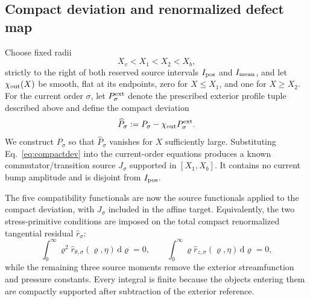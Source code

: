 \documentclass[aps,prd,reprint,superscriptaddress,nofootinbib,floatfix]{revtex4-2}
\theoremstyle{definition}
\theoremstyle{remark}
\newcommand{\dd}{\mathrm{d}}
\begin{document}
\subsection{Compact deviation and renormalized defect map}
Choose fixed radii
\begin{equation}
	X_v<X_1<X_2<X_b,
	\label{eq:spliceinterval}
\end{equation}
strictly to the right of both reserved source intervals $I_{\rm pos}$ and $I_{\rm mean}$, and let $\chi_{\rm out}(X)$ be smooth, flat at its endpoints, zero for $X\le X_1$, and one for $X\ge X_2$.  For the current order $\sigma$, let $P_\sigma^{\rm ext}$ denote the prescribed exterior profile tuple described above and define the compact deviation
\begin{equation}
	\widehat P_\sigma:=P_\sigma-\chi_{\rm out}P_\sigma^{\rm ext}.
	\label{eq:compactdev}
\end{equation}
We construct $P_\sigma$ so that $\widehat P_\sigma$ vanishes for $X$ sufficiently large.  Substituting Eq.~\eqref{eq:compactdev} into the current-order equations produces a known commutator/transition source $J_\sigma$ supported in $[X_1,X_b]$.  It contains no current bump amplitude and is disjoint from $I_{\rm pos}$.

The five compatibility functionals are now the source functionals applied to the compact deviation, with $J_\sigma$ included in the affine target.  Equivalently, the two stress-primitive conditions are imposed on the total compact renormalized tangential residual $\widehat r_\sigma$:
\begin{equation}
	\int_0^\infty \varrho^2\widehat r_{\theta,\sigma}(\varrho,\eta)\,\dd\varrho=0,
	\qquad
	\int_0^\infty \varrho\widehat r_{z,\sigma}(\varrho,\eta)\,\dd\varrho=0,
	\label{eq:renormstressmom}
\end{equation}
while the remaining three source moments remove the exterior streamfunction and pressure constants.  Every integral is finite because the objects entering them are compactly supported after subtraction of the exterior reference.
\end{document}
